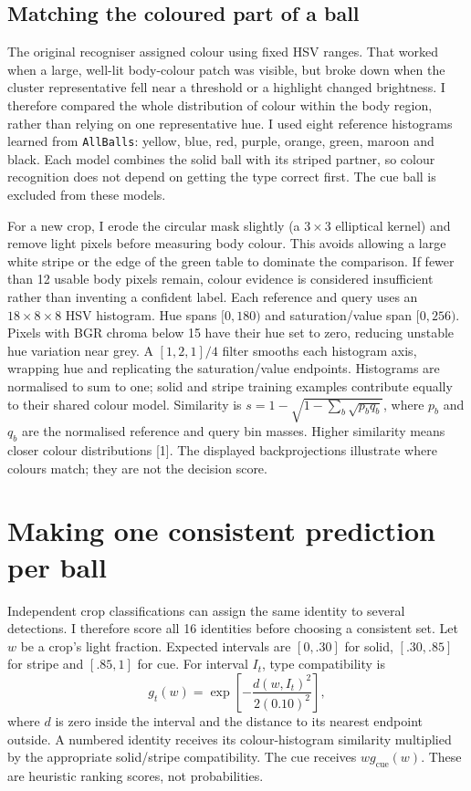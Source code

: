 \documentclass[12pt,a4paper]{article}
\begin{document}
\subsection{Matching the coloured part of a ball}
The original recogniser assigned colour using fixed HSV ranges. That worked when a large, well-lit body-colour patch was visible, but broke down when the cluster representative fell near a threshold or a highlight changed brightness. I therefore compared the whole distribution of colour within the body region, rather than relying on one representative hue. I used eight reference histograms learned from \texttt{AllBalls}: yellow, blue, red, purple, orange, green, maroon and black. Each model combines the solid ball with its striped partner, so colour recognition does not depend on getting the type correct first. The cue ball is excluded from these models.

For a new crop, I erode the circular mask slightly (a $3\times3$ elliptical kernel) and remove light pixels before measuring body colour. This avoids allowing a large white stripe or the edge of the green table to dominate the comparison. If fewer than 12 usable body pixels remain, colour evidence is considered insufficient rather than inventing a confident label. Each reference and query uses an $18\times8\times8$ HSV histogram. Hue spans $[0,180)$ and saturation/value span $[0,256)$. Pixels with BGR chroma below 15 have their hue set to zero, reducing unstable hue variation near grey. A $[1,2,1]/4$ filter smooths each histogram axis, wrapping hue and replicating the saturation/value endpoints. Histograms are normalised to sum to one; solid and stripe training examples contribute equally to their shared colour model. Similarity is $s=1-\sqrt{1-\sum_b\sqrt{p_bq_b}}$, where $p_b$ and $q_b$ are the normalised reference and query bin masses. Higher similarity means closer colour distributions [1]. The displayed backprojections illustrate where colours match; they are not the decision score.

\section{Making one consistent prediction per ball}
Independent crop classifications can assign the same identity to several detections. I therefore score all 16 identities before choosing a consistent set. Let $w$ be a crop's light fraction. Expected intervals are $[0,.30]$ for solid, $[.30,.85]$ for stripe and $[.85,1]$ for cue. For interval $I_t$, type compatibility is
\[
 g_t(w)=\exp\!\left[-\frac{d(w,I_t)^2}{2(0.10)^2}\right],
\]
where $d$ is zero inside the interval and the distance to its nearest endpoint outside. A numbered identity receives its colour-histogram similarity multiplied by the appropriate solid/stripe compatibility. The cue receives $w g_{\mathrm{cue}}(w)$. These are heuristic ranking scores, not probabilities.
\end{document}
